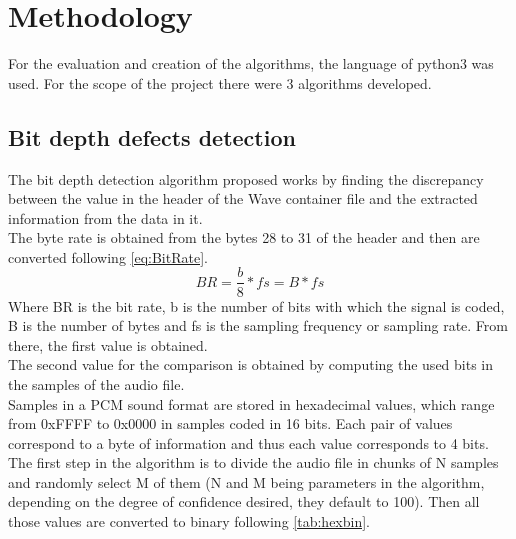 \normallinespacing

\chapter{Methodology}

For the evaluation and creation of the algorithms, the language of python3 was used. For the scope of the project there were 3 algorithms developed. 

\section{Bit depth defects detection}

The bit depth detection algorithm proposed works by finding the discrepancy between the value in the header of the Wave container file and the 
extracted information from the data in it. \\
The byte rate is obtained from the bytes 28 to 31 of the header and then are converted following \ref{eq:BitRate}.
\begin{equation}
BR=\frac{b}{8}*fs=B*fs
\label{eq:BitRate}
\end{equation} 
Where BR is the bit rate, b is the number of bits with which the signal is coded, B is the number of bytes and fs is the sampling frequency or 
sampling rate. From there, the first value is obtained.\\
The second value for the comparison is obtained by computing the used bits in the samples of the audio file.\\
Samples in a PCM sound format are stored in hexadecimal values, which range from 0xFFFF to 0x0000 in samples coded in 16 bits. Each pair of values 
correspond to a byte of information and thus each value corresponds to 4 bits. \\
The first step in the algorithm is to divide the audio file in chunks of N samples and randomly select M of them (N and M being parameters in the 
algorithm, depending on the degree of confidence desired, they default to 100). Then all those values are converted to binary following \ref{tab:hexbin}.

